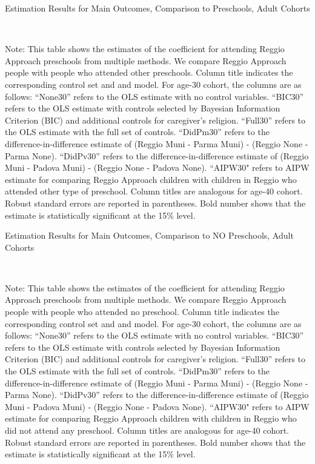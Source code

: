 \begin{landscape}
\begin{table}[H] \caption{Estimation Results for Main Outcomes, Comparison to Preschools, Adult Cohorts} \label{ols-M-adult-reg-pres}
\scalebox{0.8}{}
\vspace{1ex} \\
\footnotesize\raggedright{Note: This table shows the estimates of the coefficient for attending Reggio Approach preschools from multiple methods. We compare Reggio Approach people with people who attended other preschools.  Column title indicates the corresponding control set and and model. For age-30 cohort, the columns are as follows: ``None30'' refers to the OLS estimate with no control variables. ``BIC30'' refers to the OLS estimate with controls selected by Bayesian Information Criterion (BIC) and additional controls for caregiver's religion. ``Full30'' refers to the OLS estimate with the full set of controls. ``DidPm30'' refers to the difference-in-difference estimate of (Reggio Muni - Parma Muni) - (Reggio None - Parma None). ``DidPv30'' refers to the difference-in-difference estimate of (Reggio Muni - Padova Muni) - (Reggio None - Padova None).  ``AIPW30" refers to AIPW estimate for comparing Reggio Approach children with children in Reggio who attended other type of preschool. Column titles are analogous for age-40 cohort. Robust standard errors are reported in parentheses. Bold number shows that the estimate is statistically significant at the 15\% level.}
\end{table}

\begin{table}[H] \caption{Estimation Results for Main Outcomes, Comparison to NO Preschools, Adult Cohorts} \label{ols-M-adult-reg-nopres}
\scalebox{0.8}{}
\vspace{1ex} \\
\footnotesize\raggedright{Note: This table shows the estimates of the coefficient for attending Reggio Approach preschools from multiple methods. We compare Reggio Approach people with people who attended no preschool. Column title indicates the corresponding control set and and model. For age-30 cohort, the columns are as follows: ``None30'' refers to the OLS estimate with no control variables. ``BIC30'' refers to the OLS estimate with controls selected by Bayesian Information Criterion (BIC) and additional controls for caregiver's religion. ``Full30'' refers to the OLS estimate with the full set of controls. ``DidPm30'' refers to the difference-in-difference estimate of (Reggio Muni - Parma Muni) - (Reggio None - Parma None). ``DidPv30'' refers to the difference-in-difference estimate of (Reggio Muni - Padova Muni) - (Reggio None - Padova None).  ``AIPW30" refers to AIPW estimate for comparing Reggio Approach children with children in Reggio who did not attend any preschool. Column titles are analogous for age-40 cohort. Robust standard errors are reported in parentheses. Bold number shows that the estimate is statistically significant at the 15\% level.}
\end{table}

\end{landscape}

